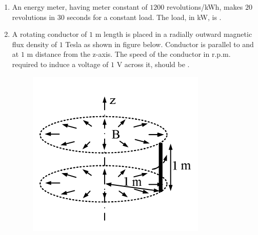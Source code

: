 \documentclass[journal,12pt,onecolumn]{IEEEtran}
\theoremstyle{remark}
\begin{document}
\begin{enumerate}[start=1, label=Q.\arabic*]
    \hfill{}

    \item An energy meter, having meter constant of $1200$ revolutions/kWh, makes $20$ revolutions in $30$ seconds for a constant load. The load, in kW, is \underline{\hspace{2cm}}.

    \hfill{}

    \item A rotating conductor of $1$ m length is placed in a radially outward  magnetic flux density  of $1$ Tesla as shown in figure below. Conductor is parallel to and at $1$ m distance from the z-axis. The speed of the conductor in r.p.m. required to induce a voltage of $1$ V across it, should be \underline{\hspace{2cm}}.
\begin{figure}[H]
        \includegraphics[width=0.6\columnwidth]{Figures/2q55.png}
        \centering
        \caption{}
    \end{figure}
    \hfill{}

\end{enumerate}
\end{document}

